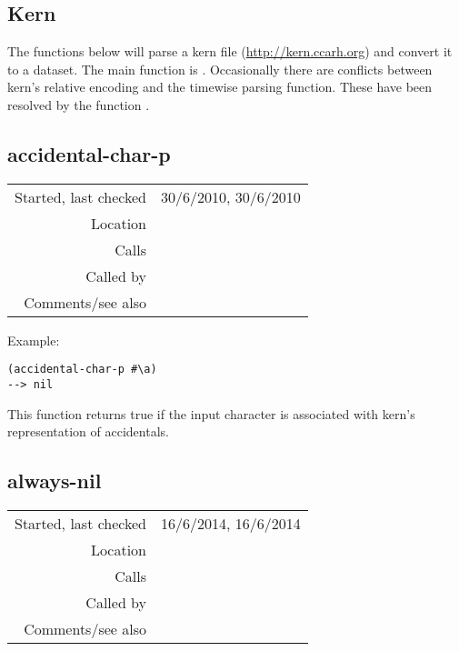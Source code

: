 \subsection{Kern}\label{sec:kern}

The functions below will parse a kern file
(\href{http://kern.ccarh.org}{http://kern.ccarh.org}) and convert it to a dataset.
The main function is . Occasionally
there are conflicts between kern's relative encoding
and the timewise parsing function. These have been
resolved by the function .


\subsection*{accidental-char-p}\label{fun:accidental-char-p}

\vspace{0.3cm}
\begin{tabular}{r|p{8cm}}
Started, last checked & 30/6/2010, 30/6/2010 \\
Location & \nameref{sec:kern} \\
Calls & \\
Called by & \nameref{fun:kern-pitch-chars2pitch-and-octave} \\
Comments/see also &
\end{tabular}

\vspace{0.5cm}
\noindent Example:
\begin{verbatim}
(accidental-char-p #\a)
--> nil
\end{verbatim}

\noindent This function returns true if the input
character is associated with kern's representation of
accidentals.


\subsection*{always-nil}\label{fun:always-nil}

\vspace{0.3cm}
\begin{tabular}{r|p{8cm}}
Started, last checked & 16/6/2014, 16/6/2014 \\
Location & \nameref{sec:kern} \\
Calls & \\
Called by & \nameref{fun:kern-file2points-artic-dynam-lyrics} \\
Comments/see also &
\end{tabular}

